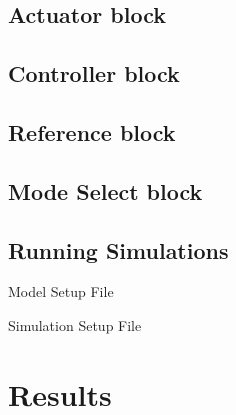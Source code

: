 \subsection{Actuator block} %
\subsection{Controller block} %
\subsection{Reference block} %
\subsection{Mode Select block} %
\subsection{Running Simulations}
Model Setup File

Simulation Setup File

\section{Results}
